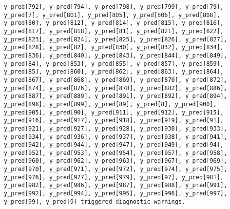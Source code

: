 \documentclass[
  letterpaper,
  DIV=11,
  numbers=noendperiod]{scrartcl}
\begin{document}
\begin{verbatim}
y_pred[792], y_pred[794], y_pred[798], y_pred[799], y_pred[79],
y_pred[7], y_pred[801], y_pred[805], y_pred[806], y_pred[808],
y_pred[80], y_pred[812], y_pred[814], y_pred[815], y_pred[816],
y_pred[817], y_pred[818], y_pred[81], y_pred[821], y_pred[822],
y_pred[823], y_pred[824], y_pred[825], y_pred[826], y_pred[827],
y_pred[828], y_pred[82], y_pred[830], y_pred[832], y_pred[834],
y_pred[836], y_pred[840], y_pred[843], y_pred[844], y_pred[849],
y_pred[84], y_pred[853], y_pred[855], y_pred[857], y_pred[859],
y_pred[85], y_pred[860], y_pred[862], y_pred[863], y_pred[864],
y_pred[867], y_pred[868], y_pred[869], y_pred[870], y_pred[872],
y_pred[874], y_pred[876], y_pred[878], y_pred[882], y_pred[886],
y_pred[887], y_pred[889], y_pred[891], y_pred[892], y_pred[894],
y_pred[898], y_pred[899], y_pred[89], y_pred[8], y_pred[900],
y_pred[905], y_pred[90], y_pred[911], y_pred[912], y_pred[915],
y_pred[916], y_pred[917], y_pred[918], y_pred[919], y_pred[91],
y_pred[921], y_pred[927], y_pred[928], y_pred[930], y_pred[933],
y_pred[934], y_pred[936], y_pred[937], y_pred[938], y_pred[941],
y_pred[942], y_pred[944], y_pred[947], y_pred[949], y_pred[94],
y_pred[952], y_pred[953], y_pred[954], y_pred[957], y_pred[958],
y_pred[960], y_pred[962], y_pred[963], y_pred[967], y_pred[969],
y_pred[970], y_pred[971], y_pred[972], y_pred[974], y_pred[975],
y_pred[976], y_pred[977], y_pred[979], y_pred[97], y_pred[981],
y_pred[982], y_pred[986], y_pred[987], y_pred[988], y_pred[991],
y_pred[992], y_pred[994], y_pred[995], y_pred[996], y_pred[997],
y_pred[99], y_pred[9] triggered diagnostic warnings.
 

\end{verbatim}
\end{document}
